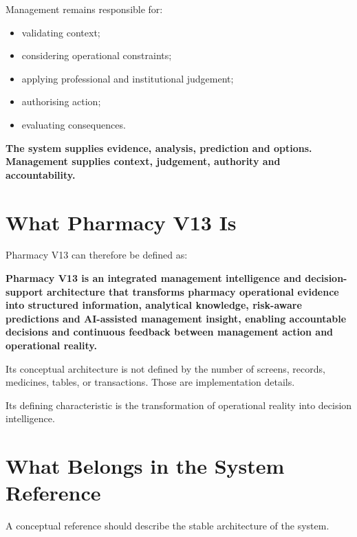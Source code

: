 \documentclass[11pt,a4paper]{article}
\begin{document}
Management remains responsible for:

\begin{itemize}
\item validating context;
\item considering operational constraints;
\item applying professional and institutional judgement;
\item authorising action;
\item evaluating consequences.
\end{itemize}

\begin{principle}
\centering
\large
\textbf{The system supplies evidence, analysis, prediction and options.\\
Management supplies context, judgement, authority and accountability.}
\end{principle}

\section{What Pharmacy V13 Is}

Pharmacy V13 can therefore be defined as:

\begin{keyidea}
\textbf{Pharmacy V13 is an integrated management intelligence and
decision-support architecture that transforms pharmacy operational evidence
into structured information, analytical knowledge, risk-aware predictions and
AI-assisted management insight, enabling accountable decisions and continuous
feedback between management action and operational reality.}
\end{keyidea}

Its conceptual architecture is not defined by the number of screens, records,
medicines, tables, or transactions. Those are implementation details.

Its defining characteristic is the transformation of operational reality into
decision intelligence.

\section{What Belongs in the System Reference}

A conceptual reference should describe the stable architecture of the system.
\end{document}
